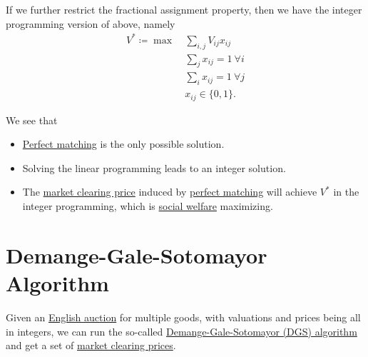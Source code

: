 If we further restrict the fractional assignment property, then we have the integer programming version of above, namely
\[
	\begin{aligned}
		V^{\ast} \coloneqq \max~ & \sum\limits_{i, j}V_{ij}x_{ij}       \\
		                         & \sum\limits_{j}x_{ij} = 1\ \forall i \\
		                         & \sum\limits_{i}x_{ij} = 1\ \forall j \\
		                         & x_{ij}\in\{0, 1\}.
	\end{aligned}
\]

\begin{remark}
	We see that
	\begin{itemize}
		\item \hyperref[def:perfect-matching]{Perfect matching} is the only possible solution.
		\item Solving the linear programming leads to an integer solution.
		\item The \hyperref[note:market-clearing-prices]{market clearing price} induced by \hyperref[def:perfect-matching]{perfect matching} will achieve \(V^{\ast}\) in the integer programming, which is \hyperref[def:social-welfare]{social welfare} maximizing.
	\end{itemize}
\end{remark}

\section{Demange-Gale-Sotomayor Algorithm}
Given an \hyperref[eg:English-auction]{English auction} for multiple goods, with valuations and prices being all in integers, we can run the so-called \hyperref[algo:Demange-Gale-Sotomayor-algorithm]{Demange-Gale-Sotomayor (DGS) algorithm} and get a set of \hyperref[note:market-clearing-prices]{market clearing prices}.

